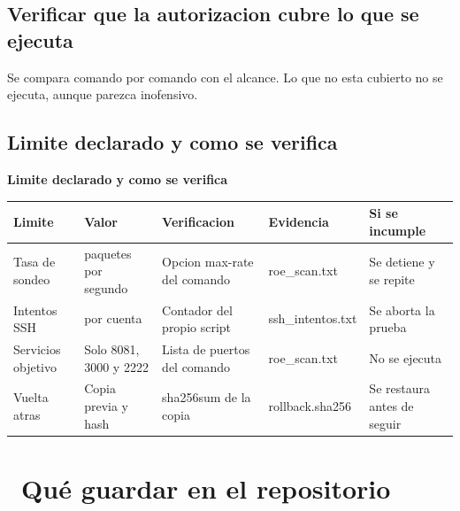 \documentclass[11pt,a4paper]{article}
\newcommand{\iconotexto}[2]{\textcolor{cyanNeon}{\faIcon{#1}}~#2}
\begin{document}
\subsection{Verificar que la autorizacion cubre lo que se ejecuta}

Se compara comando por comando con el alcance. Lo que no esta cubierto no se ejecuta, aunque parezca inofensivo.

\subsection{Limite declarado y como se verifica}

\begin{center}
\begin{minipage}{\linewidth}
\centering
{\footnotesize
\textbf{Limite declarado y como se verifica}\par\smallskip
\begin{tabular}{@{}>{\raggedright\arraybackslash}p{2.40cm}>{\raggedright\arraybackslash}p{1.80cm}>{\raggedright\arraybackslash}p{3.60cm}>{\raggedright\arraybackslash}p{2.80cm}>{\raggedright\arraybackslash}p{3.40cm}@{}}
\toprule
\textbf{Limite} & \textbf{Valor} & \textbf{Verificacion} & \textbf{Evidencia} & \textbf{Si se incumple} \\
\midrule
Tasa de sondeo & 20 paquetes por segundo & Opcion max-rate del comando & roe\_scan.txt & Se detiene y se repite \\
Intentos SSH & 20 por cuenta & Contador del propio script & ssh\_intentos.txt & Se aborta la prueba \\
Servicios objetivo & Solo 8081, 3000 y 2222 & Lista de puertos del comando & roe\_scan.txt & No se ejecuta \\
Vuelta atras & Copia previa y hash & sha256sum de la copia & rollback.sha256 & Se restaura antes de seguir \\
\bottomrule
\end{tabular}
}
\par{}
\end{minipage}
\end{center}

\section{\iconotexto{box-open}{Qué guardar en el repositorio}}
\end{document}
